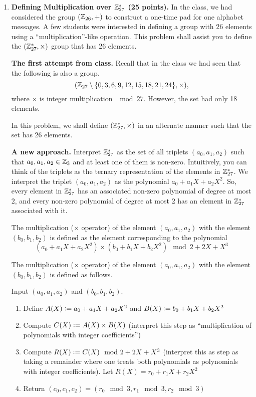 \documentclass[11pt]{article}
\begin{document}
\begin{enumerate}
\item {\bfseries Defining Multiplication over ${\mathbb Z}_{27}^*$ (25 points).} 
  In the class, we had considered the group $({\mathbb Z}_{26},+)$ to construct a one-time pad for one alphabet messages. 
  A few students were interested in defining a group with 26 elements using a ``multiplication''-like operation. 
  This problem shall assist you to define the $({\mathbb Z}_{27}^*,\times)$ group that has 26 elements.
  
  {\bfseries The first attempt from class.}
  Recall that in the class we had seen that the following is also a group.
    $$ ({\mathbb Z}_{27}\setminus\{0,3,6,9,12,15,18,21,24\},\times),$$
  where $\times$ is integer multiplication $\mod 27$. 
  However, the set had only 18 elements. 
  
  In this problem, we shall define $({\mathbb Z}_{27}^*,\times)$ in an alternate manner such that the set has 26 elements. 
  
  {\bfseries A new approach.} 
  Interpret ${\mathbb Z}_{27}^*$ as the set of all triplets $(a_0,a_1,a_2)$ such that $a_0,a_1,a_2 \in {\mathbb Z}_3$ and at least one of them is non-zero. 
  Intuitively, you can think of the triplets as the ternary representation of the elements in ${\mathbb Z}_{27}^*$. 
  We interpret the triplet $(a_0,a_1,a_2)$ as the polynomial $a_0 + a_1X + a_2X^2$. 
  So, every element in ${\mathbb Z}_{27}^*$ has an associated non-zero polynomial of degree at most 2, and every non-zero polynomial of degree at most 2 has an element in ${\mathbb Z}_{27}^*$ associated with it. 
  
  The multiplication ($\times$ operator) of the element $(a_0,a_1,a_2)$ with the element $(b_0,b_1,b_2)$ is defined as the element corresponding to the polynomial
    $$(a_0 + a_1X + a_2X^2) \times (b_0 + b_1X + b_2X^2) \mod 2 + 2X + X^3$$
    
  The multiplication ($\times$ operator) of the element $(a_0,a_1,a_2)$ with the element $(b_0,b_1,b_2)$ is defined as follows.\newline
  \begin{boxedminipage}{\linewidth}
  Input $(a_0,a_1,a_2)$ and $(b_0,b_1,b_2)$.
  \begin{enumerate}
  \item Define $A(X) {\;\vcentcolon=\;} a_0 + a_1X + a_2X^2$ and $B(X) {\;\vcentcolon=\;} b_0+b_1X+b_2X^2$
  \item Compute $C(X) {\;\vcentcolon=\;} A(X)\times B(X)$ (interpret this step as ``multiplication of polynomials with integer coefficients'') 
  \item Compute $R(X) {\;\vcentcolon=\;} C(X) \mod 2+2X+X^3$ (interpret this as step as taking a remainder where one treats both polynomials as polynomials with integer coefficients). 
    Let $R(X) = r_0 + r_1X + r_2X^2$
  \item Return $(c_0,c_1,c_2) = (r_0\mod 3, r_1\mod 3, r_2\mod 3)$


\end{enumerate}
\end{boxedminipage}
\end{enumerate}
\end{document}
